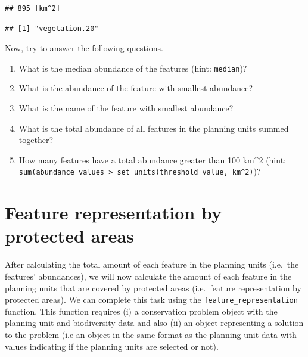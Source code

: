 \documentclass[12pt,]{book}
\newenvironment{Shaded}{\begin{snugshade}}{\end{snugshade}}
\newcommand{\KeywordTok}[1]{\textcolor[rgb]{0.13,0.29,0.53}{\textbf{#1}}}
\newcommand{\CommentTok}[1]{\textcolor[rgb]{0.56,0.35,0.01}{\textit{#1}}}
\newcommand{\OperatorTok}[1]{\textcolor[rgb]{0.81,0.36,0.00}{\textbf{#1}}}
\newcommand{\NormalTok}[1]{#1}
\providecommand{\tightlist}{%
  \setlength{\itemsep}{0pt}\setlength{\parskip}{0pt}}
\let\BeginKnitrBlock\begin \let\EndKnitrBlock\end
\begin{document}
\begin{verbatim}
## 895 [km^2]
\end{verbatim}

\begin{Shaded}
\end{Shaded}

\begin{verbatim}
## [1] "vegetation.20"
\end{verbatim}

Now, try to answer the following questions.

\BeginKnitrBlock{rmdquestion}
\begin{enumerate}
\def\labelenumi{\arabic{enumi}.}
\tightlist
\item
  What is the median abundance of the features (hint: \texttt{median})?
\item
  What is the abundance of the feature with smallest abundance?
\item
  What is the name of the feature with smallest abundance?
\item
  What is the total abundance of all features in the planning units
  summed together?
\item
  How many features have a total abundance greater than 100 km\^{}2
  (hint:
  \texttt{sum(abundance\_values\ \textgreater{}\ set\_units(threshold\_value,\ km\^{}2)})?
\end{enumerate}
\EndKnitrBlock{rmdquestion}

\section{Feature representation by protected
areas}\label{feature-representation-by-protected-areas}

After calculating the total amount of each feature in the planning units
(i.e.~the features' abundances), we will now calculate the amount of
each feature in the planning units that are covered by protected areas
(i.e.~feature representation by protected areas). We can complete this
task using the \texttt{feature\_representation} function. This function
requires (i) a conservation problem object with the planning unit and
biodiversity data and also (ii) an object representing a solution to the
problem (i.e an object in the same format as the planning unit data with
values indicating if the planning units are selected or not).
\end{document}
